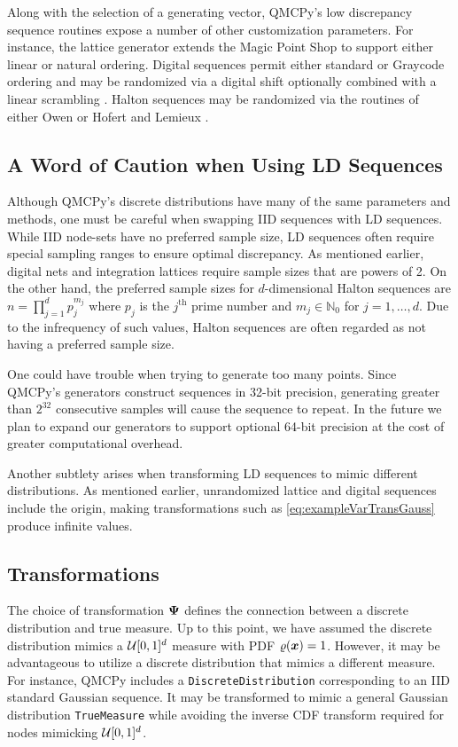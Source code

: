 \documentclass[graybox,footinfo]{svmult}
\begin{document}
Along with the selection of a generating vector, QMCPy's low discrepancy sequence routines expose a number of other customization parameters. For instance, the lattice generator extends the Magic Point Shop \cite{Nuy17a} to support either linear or natural ordering. Digital sequences permit either standard or Graycode ordering and may be randomized via a digital shift optionally combined with a linear scrambling \cite{Mat98}. Halton sequences may be randomized via the routines of either Owen \cite{Owe20a} or Hofert and Lemieux \cite{QRNG2020}. 

\subsection{A Word of Caution when Using LD Sequences}

Although QMCPy's discrete distributions have many of the same parameters and methods, one must be careful when swapping IID sequences with LD sequences. While IID node-sets have no preferred sample size, LD sequences often require special sampling ranges to ensure optimal discrepancy. As mentioned  earlier, digital nets and integration lattices require sample sizes that are powers of 2. On the other hand, the preferred sample sizes for $d$-dimensional Halton sequences are $n = \prod_{j=1}^d p^{m_j}_j$ where $p_j$ is the $j^{\text{th}}$ prime number and $m_j \in \mathbb{N}_0$ for $j=1,\dots,d$. Due to the infrequency of such values, Halton sequences are often regarded as not having a preferred sample size.  

One could have trouble when trying to generate too many points. Since QMCPy's generators construct sequences in 32-bit precision, generating greater than $2^{32}$ consecutive samples will cause the sequence to repeat. In the future we plan to expand our generators to support optional 64-bit precision at the cost of greater computational overhead.

Another subtlety arises when transforming LD sequences to mimic different distributions. As mentioned earlier, unrandomized lattice and digital sequences include the origin, making transformations such as \eqref{eq:exampleVarTransGauss} produce infinite values.

\subsection{Transformations}

The choice of transformation ${\boldsymbol{\Psi}}$ defines the connection between a discrete distribution and true measure. Up to this point, we have assumed the discrete distribution mimics a ${\mathcal{U}}[0,1]^d$ measure with PDF $\varrho({\boldsymbol{x}})=1$. However, it may be advantageous to utilize a discrete distribution that mimics a different measure. For instance, QMCPy includes a \texttt{DiscreteDistribution} corresponding to an IID standard Gaussian sequence.  It may be transformed to mimic a general Gaussian distribution \texttt{TrueMeasure} while avoiding the inverse CDF transform required for nodes mimicking ${\mathcal{U}}[0,1]^d$. 
\end{document}
